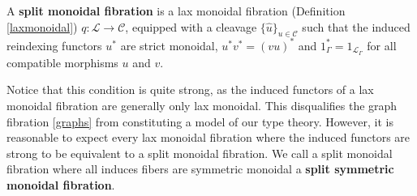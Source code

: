 \documentclass[a4paper,english]{lipics-v2018}
\begin{document}
\begin{definition}\label{splitmonoidal}
 A \textbf{split monoidal fibration} is a lax monoidal fibration (Definition \ref{laxmonoidal})  $q : \mathcal{L} \to \mathcal{C}$, equipped with a cleavage  $\{ \hat u \}_{u \in \mathcal{C}}$ such that the induced reindexing functors $u^*$ are strict monoidal, $u^*v^* = (vu)^*$ and $1_\Gamma^* = 1_{\mathcal{L}_\Gamma}$ for all compatible morphisms $u$ and $v$.
\end{definition}
Notice that this condition is quite strong, as the induced functors of a lax monoidal fibration are generally only lax monoidal. This disqualifies the graph fibration \ref{graphs} from constituting a model of our type theory. However, it is reasonable to expect every lax monoidal fibration where the induced functors are strong to be equivalent to a split monoidal fibration. We call a split monoidal fibration where all induces fibers are symmetric monoidal a \textbf{split symmetric monoidal fibration}.
\end{document}
